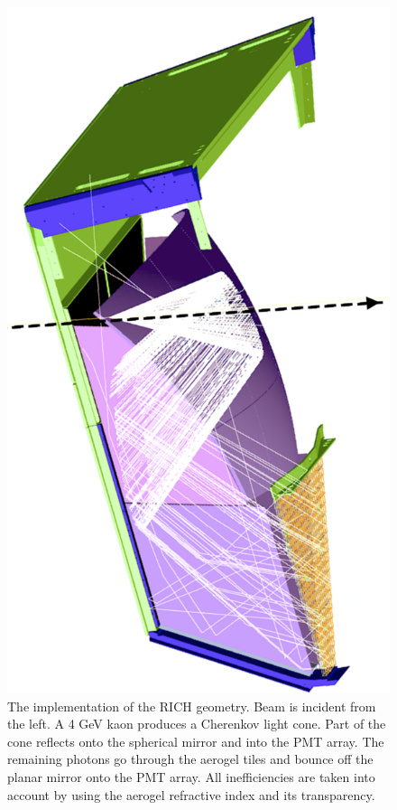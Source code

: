 \begin{figure}
	\centering
	\includegraphics[width=0.99\columnwidth, keepaspectratio]{img/richGeometry.png}
	\caption{The implementation of the RICH geometry. Beam is incident from the left. A 4 GeV kaon produces a Cherenkov light cone.
			 Part of the cone reflects onto the spherical mirror and into the PMT array. The remaining photons go through the aerogel tiles
			 and bounce off the planar mirror onto the PMT array. All inefficiencies are taken into account by using the aerogel refractive index
			 and its transparency. }
	\label{fig:richGeometry}
\end{figure}

